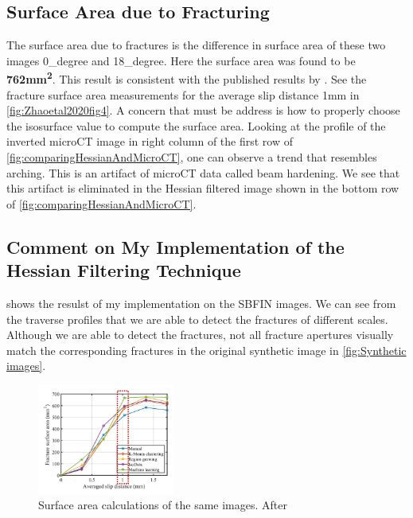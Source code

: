\documentclass{edger}
\begin{document}
\subsection{Surface Area due to Fracturing}
The surface area due to fractures is the difference in surface area of these two images 0\_degree and 18\_degree. Here the surface area was found to be \textbf{762\si{mm^2}}. This result is consistent with the published results by \cite[figure 4]{Zhao2020}. See the fracture surface area measurements for the average slip distance 1mm in \autoref{fig:Zhaoetal2020fig4}. A concern that must be address is how to properly choose the isosurface value to compute the surface area. Looking at the profile of the inverted microCT image in right column of the first row of \autoref{fig:comparingHessianAndMicroCT}, one can observe a trend that resembles arching. This is an artifact of microCT data called beam hardening. We see that this artifact is eliminated in the Hessian filtered image shown in the bottom row of \autoref{fig:comparingHessianAndMicroCT}. 

\subsection{Comment on My Implementation of the Hessian Filtering Technique} \label{sec:furtherComment}
 shows the resulst of my implementation on the SBFIN images.  We can see from the traverse profiles that we are able to detect the fractures of different scales. Although we are able to detect the fractures, not all fracture apertures visually match the corresponding fractures in the original synthetic image in \autoref{fig:Synthetic images}. 

\begin{figure}
\vspace{-20pt}
\centering
\includegraphics[width=0.4\textwidth]{Zhaoetal2020fig4.png}
\caption{Surface area calculations of the same images. After \cite[figure 4]{Zhao2020}}
\label{fig:Zhaoetal2020fig4}
\end{figure}
\end{document}
